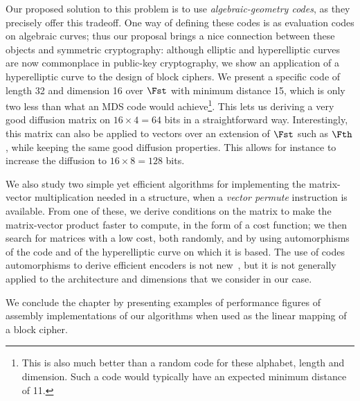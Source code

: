 Our proposed solution to this problem is to use \emph{algebraic-geometry codes}, as they precisely offer this tradeoff.
One way of defining these codes is as evaluation codes on algebraic curves; thus our proposal brings a nice connection between these objects and
symmetric cryptography: although elliptic and hyperelliptic curves are now commonplace in public-key cryptography, we show an application of
a hyperelliptic curve to the design of block ciphers. We present a specific code of length 32 and dimension 16 over $\Fst$ with minimum distance 15, which is only
two less than what an MDS code would achieve\footnote{This is also much better than a random code for these alphabet, length and dimension. Such a code
would typically have an expected minimum distance of 11.}.
This lets us deriving a very good diffusion matrix on $16\times4 = 64$ bits in a straightforward way. Interestingly, this matrix can also be applied
to vectors over an extension of $\Fst$ such as $\Fth$, while keeping the same good diffusion properties.
This allows for instance to increase the diffusion to $16\times8 = 128$ bits.

We also study two simple yet efficient algorithms for implementing the matrix-vector multiplication needed in a \shark{}
structure, when a \emph{vector permute} instruction is available. From one of these, we derive conditions on the matrix to make the matrix-vector product
faster to compute, in the form of a cost function; we then search for matrices with a low cost, both randomly, and by using automorphisms of the code and of the hyperelliptic
curve on which it is based. The use of codes automorphisms to derive efficient encoders is not new~\cite{sysgrob,grobarch},
but it is not generally applied to the architecture and dimensions that we consider in our case.

We conclude the chapter by presenting examples of performance figures of assembly implementations of our algorithms when used as the linear mapping of
a block cipher.
